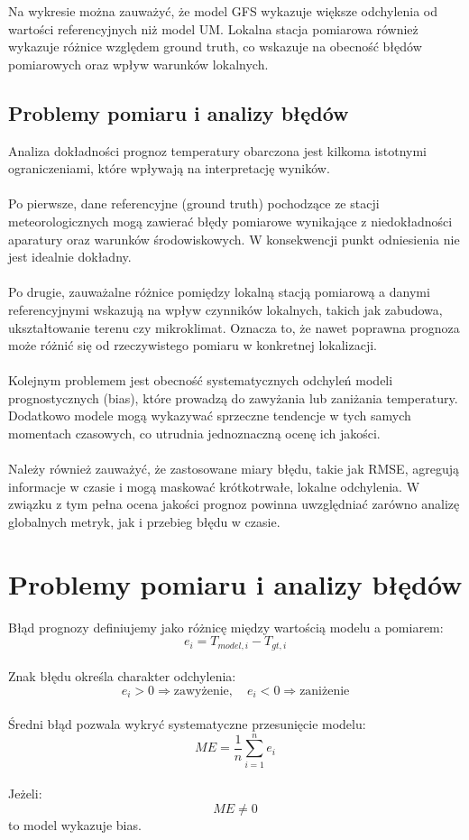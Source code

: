 \documentclass[a4paper,12pt]{article}
\begin{document}
\noindent
Na wykresie można zauważyć, że model GFS wykazuje większe odchylenia od wartości referencyjnych niż model UM. Lokalna stacja pomiarowa również wykazuje różnice względem ground truth, co wskazuje na obecność błędów pomiarowych oraz wpływ warunków lokalnych.




\subsection{Problemy pomiaru i analizy błędów}

Analiza dokładności prognoz temperatury obarczona jest kilkoma istotnymi ograniczeniami, które wpływają na interpretację wyników.
\\
\\
\noindent
Po pierwsze, dane referencyjne (ground truth) pochodzące ze stacji meteorologicznych mogą zawierać błędy pomiarowe wynikające z niedokładności aparatury oraz warunków środowiskowych. W konsekwencji punkt odniesienia nie jest idealnie dokładny.
\\
\\
\noindent
Po drugie, zauważalne różnice pomiędzy lokalną stacją pomiarową a danymi referencyjnymi wskazują na wpływ czynników lokalnych, takich jak zabudowa, ukształtowanie terenu czy mikroklimat. Oznacza to, że nawet poprawna prognoza może różnić się od rzeczywistego pomiaru w konkretnej lokalizacji.
\\
\\
\noindent
Kolejnym problemem jest obecność systematycznych odchyleń modeli prognostycznych (bias), które prowadzą do zawyżania lub zaniżania temperatury. Dodatkowo modele mogą wykazywać sprzeczne tendencje w tych samych momentach czasowych, co utrudnia jednoznaczną ocenę ich jakości.
\\
\\
\noindent
Należy również zauważyć, że zastosowane miary błędu, takie jak RMSE, agregują informacje w czasie i mogą maskować krótkotrwałe, lokalne odchylenia. W związku z tym pełna ocena jakości prognoz powinna uwzględniać zarówno analizę globalnych metryk, jak i przebieg błędu w czasie.


\section{Problemy pomiaru i analizy błędów}

Błąd prognozy definiujemy jako różnicę między wartością modelu a pomiarem:
\[
e_i = T_{model,i} - T_{gt,i}
\]
\\
\noindent
Znak błędu określa charakter odchylenia:
\[
e_i > 0 \Rightarrow \text{zawyżenie}, \quad
e_i < 0 \Rightarrow \text{zaniżenie}
\]
\\
\noindent
Średni błąd pozwala wykryć systematyczne przesunięcie modelu:
\[
ME = \frac{1}{n} \sum_{i=1}^{n} e_i
\]
\\
\noindent
Jeżeli:
\[
ME \neq 0
\]
to model wykazuje bias.
\\
\end{document}

